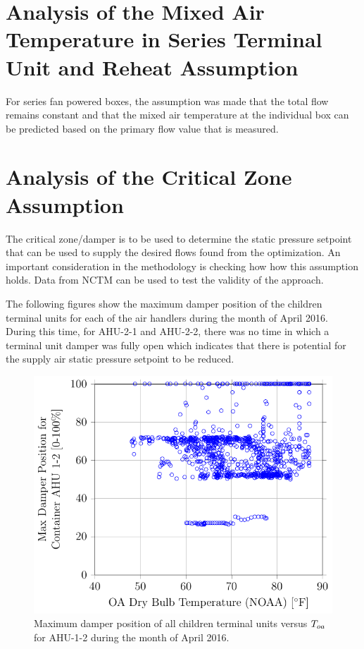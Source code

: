 \section{Analysis of the Mixed Air Temperature in Series Terminal Unit and Reheat Assumption}

For series fan powered boxes, the assumption was made that the total flow remains constant and that the mixed air temperature at the individual box can be predicted based on the primary flow value that is measured. 


\section{Analysis of the Critical Zone Assumption}

The critical zone/damper is to be used to determine the static pressure setpoint that can be used to supply the desired flows found from the optimization. An important consideration in the methodology is checking how how this assumption holds. Data from NCTM can be used to test the validity of the approach.

The following figures show the maximum damper position of the children terminal units for each of the air handlers during the month of April 2016. During this time, for AHU-2-1 and AHU-2-2, there was no time in which a terminal unit damper was fully open which indicates that there is potential for the supply air static pressure setpoint to be reduced.  

\newcommand{\MaxDampCaption}[1]{Maximum damper position of all children terminal units versus \(\oat{}\) for #1 during the month of April 2016.}

\begin{figure}
\centering
\includegraphics{Plots/MaximumDamperPosition-1-2.pdf} 
\caption{\MaxDampCaption{AHU-1-2}}
\label{fig:MaxDamperPositionforContainerAHU12vsOADryBulbTemperatureNOAA}
\end{figure}

